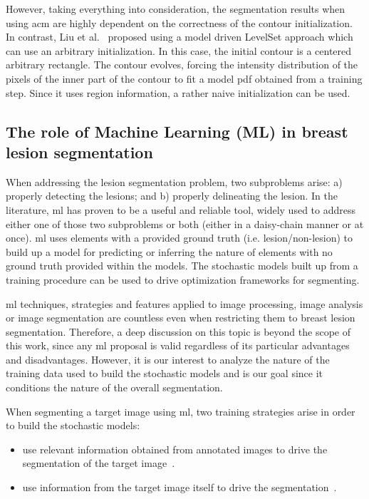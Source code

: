 \documentclass[authoryear,preprint,review,12pt]{elsarticle}
\begin{document}
 However, taking everything into consideration, the segmentation results when using \ac{acm} are highly dependent on the correctness of the contour initialization. %
In contrast, Liu et al.~\cite{Liu:2010p14328} proposed using a model driven LevelSet approach which can use an arbitrary initialization. In this case, the initial contour is a centered arbitrary rectangle. The contour evolves, forcing the intensity distribution of the pixels of the inner part of the contour to fit a model \ac{pdf} obtained from a training step. Since it uses region information, a rather naive initialization can be used.

\subsection{The role of Machine Learning (ML) in breast lesion segmentation}\label{sec:ml}

When addressing the lesion segmentation problem, two subproblems arise: a) properly detecting the lesions; and b) properly delineating the lesion. In the literature, \ac{ml} has proven to be a useful and reliable tool, widely used to address either one of those two subproblems or both (either in a daisy-chain manner or at once). 
\ac{ml} uses elements with a provided ground truth (i.e. lesion/non-lesion) to build up a model for predicting or inferring the nature of elements with no  ground truth provided within the models. The stochastic models built up from a training procedure can be used to drive optimization frameworks for segmenting.

\ac{ml} techniques, strategies and features applied to image processing, image analysis or image segmentation are countless even when restricting them to breast lesion segmentation. Therefore, a deep discussion on this topic is beyond the scope of this work, since any \ac{ml} proposal is valid regardless of its particular advantages and disadvantages. However, it is our interest to analyze the nature of the training data used to build the stochastic models and is our goal since it conditions the nature of the overall segmentation.

When segmenting a target image using \ac{ml}, two training strategies arise in order to build the stochastic models:
\begin{itemize}
\item use relevant information obtained from annotated images to drive the segmentation of the target image~\cite{Shan:2012p14347,hao2012combining}.
\item use information from the target image itself to drive the segmentation~\cite{Zhang:2010p14317,Jiang:2012p14354}.
\end{itemize}
\end{document}
